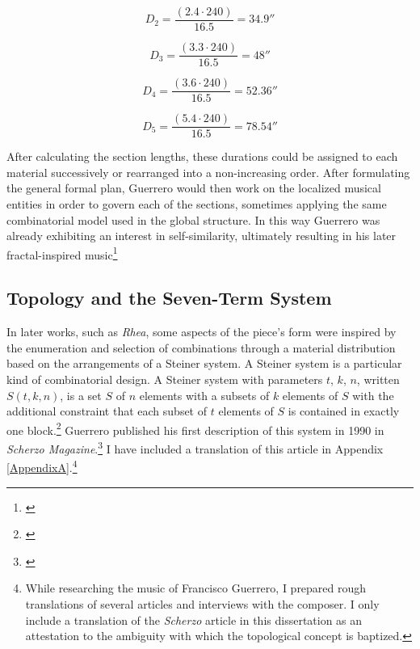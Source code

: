 \begin{equation}
    D_2 = \frac{(2.4 \cdot 240)}{16.5} = 34.9''
\end{equation}

\begin{equation}
    D_3 = \frac{(3.3 \cdot 240)}{16.5} = 48''
\end{equation}

\begin{equation}
    D_4 = \frac{(3.6 \cdot 240)}{16.5} = 52.36''
\end{equation}

\begin{equation}
    D_5 = \frac{(5.4 \cdot 240)}{16.5} = 78.54''
\end{equation}

After calculating the section lengths, these durations could be assigned to each material successively or rearranged into a non-increasing order. After formulating the general formal plan, Guerrero would then work on the localized musical entities in order to govern each of the sections, sometimes applying the same combinatorial model used in the global structure. In this way Guerrero was already exhibiting an interest in self-similarity, ultimately resulting in his later fractal-inspired music\footnote{\citet[150-151]{guerreropaper}}

\subsection{Topology and the Seven-Term System}

In later works, such as \textit{Rhea}, some aspects of the piece's form were inspired by the enumeration and selection of combinations through a material distribution based on the arrangements of a Steiner system. A Steiner system is a particular kind of combinatorial design. A Steiner system with parameters $t$, $k$, $n$, written $S(t,k,n)$, is a set $S$ of $n$ elements with a subsets of $k$ elements of $S$ with the additional constraint that each subset of $t$ elements of $S$ is contained in exactly one block.\footnote{\citet{steinerbook}} Guerrero published his first description of this system in 1990 in \textit{Scherzo Magazine}.\footnote{\citet{guerrerotopology}} I have included a translation of this article in Appendix \vref{AppendixA}.\footnote{While researching the music of Francisco Guerrero, I prepared rough translations of several articles and interviews with the composer. I only include a translation of the \textit{Scherzo} article in this dissertation as an attestation to the ambiguity with which the topological concept is baptized.}

